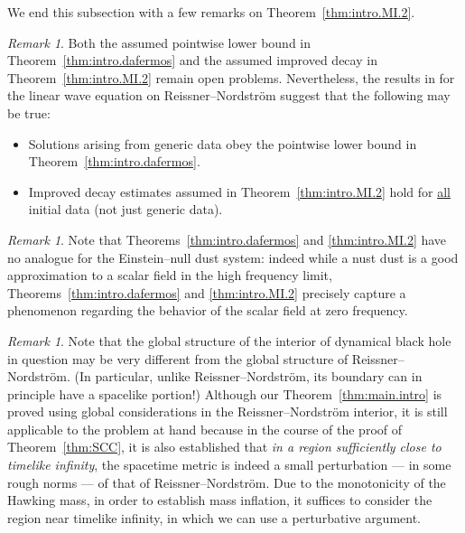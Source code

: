 \documentclass[10pt, reqno]{amsart}
\theoremstyle{definition}
\theoremstyle{remark}
\newtheorem{remark}[theorem]{Remark}
\numberwithin{equation}{section}
\newcommand{\0}{\emptyset}
\begin{document}
We end this subsection with a few remarks on Theorem~\ref{thm:intro.MI.2}.
\begin{remark}\label{rmk:expectation.AAG}
Both the assumed pointwise lower bound in Theorem~\ref{thm:intro.dafermos} and the assumed improved decay in Theorem~\ref{thm:intro.MI.2} remain open problems. Nevertheless, the results in \cite{AAG} for the linear wave equation on Reissner--Nordstr\"om suggest that the following may be true:
\begin{itemize}
\item Solutions arising from generic data obey the pointwise lower bound in Theorem~\ref{thm:intro.dafermos}.
\item Improved decay estimates assumed in Theorem~\ref{thm:intro.MI.2} hold for \underline{all} initial data (not just generic data).
\end{itemize} 
\end{remark}

\begin{remark}
Note that Theorems~\ref{thm:intro.dafermos} and \ref{thm:intro.MI.2} have no analogue for the Einstein--null dust system: indeed while a nust dust is a good approximation to a scalar field in the high frequency limit, Theorems~\ref{thm:intro.dafermos} and \ref{thm:intro.MI.2} precisely capture a phenomenon regarding the behavior of the scalar field at zero frequency.
\end{remark}

\begin{remark}
Note that the global structure of the interior of dynamical black hole in question may be very different from the global structure of Reissner--Nordstr\"om. (In particular, unlike Reissner--Nordstr\"om, its boundary can in principle have a spacelike portion!) Although our Theorem~\ref{thm:main.intro} is proved using global considerations in the Reissner--Nordstr\"om interior, it is still applicable to the problem at hand because in the course of the proof of Theorem~\ref{thm:SCC}, it is also established that \emph{in a region sufficiently close to timelike infinity}, the spacetime metric is indeed a small perturbation --- in some rough norms --- of that of Reissner--Nordstr\"om. Due to the monotonicity of the Hawking mass, in order to establish mass inflation, it suffices to consider the region near timelike infinity, in which we can use a perturbative argument.
\end{remark}
\end{document}
